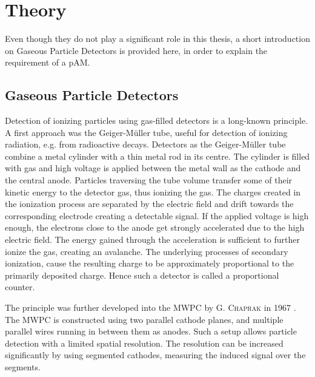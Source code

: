 \chapter{Theory}
\label{sec:theory}
Even though they do not play a significant role in this thesis, a short introduction on Gaseous Particle Detectors is provided here, in order to explain the requirement of a \acl{pAM}.
\section{Gaseous Particle Detectors}
Detection of ionizing particles using gas-filled detectors is a long-known principle. A first approach was the Geiger-Müller tube, useful for detection of ionizing radiation, e.g. from radioactive decays.
Detectors as the Geiger-Müller tube combine a metal cylinder with a thin metal rod in its centre. The cylinder is filled with gas and high voltage is applied between the metal wall as the cathode and the central anode.
Particles traversing the tube volume transfer some of their kinetic energy to the detector gas, thus ionizing the gas. The charges created in the ionization process are separated by the electric field and drift towards the corresponding electrode creating a detectable signal. 
If the applied voltage is high enough, the electrons close to the anode get strongly accelerated due to the high electric field. The energy gained through the acceleration is sufficient to further ionize the gas, creating an avalanche. The underlying processes of secondary ionization, cause the resulting charge to be approximately proportional to the primarily deposited charge. Hence such a detector is called a proportional counter.

The principle was further developed into the \ac{MWPC} by \textsc{G. Chaprak} in 1967 \cite{sauligas}. The \ac{MWPC} is constructed using two parallel cathode planes, and multiple parallel wires running in between them as anodes. Such a setup allows particle detection with a limited spatial resolution. 
The resolution can be increased significantly by using segmented cathodes, measuring the induced signal over the segments.

